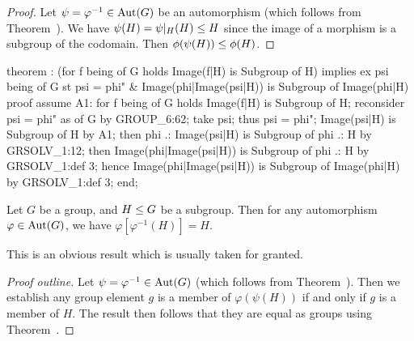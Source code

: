 \begin{proof}
Let $\psi=\varphi^{-1}\in\operatorname{Aut}(G)$ be an automorphism (which follows from
Theorem~). We have
$\psi(H)=\psi|_{H}(H)\leq H$ since the image of a morphism is a subgroup of
the codomain. Then $\phi(\psi(H))\leq\phi(H)$.
\end{proof}

\nwenddocs{}\endmoddef\nwstartdeflinemarkup{}\nwenddeflinemarkup
theorem :
  (for f being  of G holds Image(f|H) is Subgroup of H) implies
  ex psi being  of G
  st psi = phi" & Image(phi|Image(psi|H)) is Subgroup of Image(phi|H)
proof
  assume A1: for f being  of G holds Image(f|H) is Subgroup of H;
  reconsider psi = phi" as  of G by GROUP_6:62;
  take psi;
  thus psi = phi";
  Image(psi|H) is Subgroup of H by A1;
  then phi .: Image(psi|H) is Subgroup of phi .: H by GRSOLV_1:12;
  then Image(phi|Image(psi|H)) is Subgroup of phi .: H by GRSOLV_1:def 3;
  hence Image(phi|Image(psi|H)) is Subgroup of Image(phi|H) by GRSOLV_1:def 3;
end;
\eatline
{}\nwendcode{}\nwdocspar
\begin{theorem}\label{thm:characteristic:automorphism:phi-phiInv-H-is-H}
  Let $G$ be a group, and $H\leq G$ be a subgroup.
  Then for any automorphism $\varphi\in\operatorname{Aut}(G)$, we have
  $\varphi[\varphi^{-1}(H)]=H$.
\end{theorem}

This is an obvious result which is usually taken for granted.

\begin{proof}[Proof outline]
Let $\psi=\varphi^{-1}\in\operatorname{Aut}(G)$ (which follows from
Theorem~). Then we establish any
group element $g$ is a member of $\varphi(\psi(H))$ if and only if $g$
is a member of $H$.
The result then follows that they are equal as groups using Theorem~.
\end{proof}

